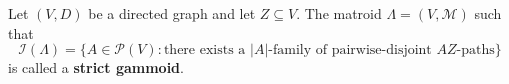 Let $(V, D)$ be a directed graph and let $Z \subseteq V$. The matroid $\Lambda = (V, \mathcal{M})$ such that
$$\mathcal{I}(\Lambda) = \{A \in \mathcal{P}(V) : \text{there exists a } |A|\text{-family of pairwise-disjoint } AZ\text{-paths}\}$$
is called a \textbf{strict gammoid}.
